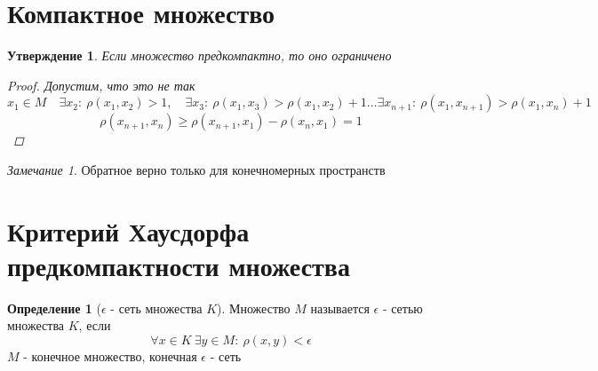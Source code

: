 \documentclass[a4paper]{article}
\newtheorem*{statement}{Утверждение}
\theoremstyle{definition}
\newtheorem*{definition}{Определение}
\theoremstyle{remark}
\newtheorem*{remark}{Замечание}
\begin{document}
\section*{\centering Компактное множество}

\begin{tcolorbox}
    \begin{statement}
        Если множество предкомпактно, то оно ограничено

        \begin{proof}
            Допустим, что это не так
            \[
                x_1 \in M \quad \exists x_2: \ \rho(x_1, x_2) > 1, \quad
                \exists x_3: \ \rho(x_1, x_3) > \rho(x_1, x_2) + 1 \dots
                \exists x_{n+1}: \ \rho(x_1, x_{n+1}) > \rho(x_1, x_n) + 1
            \]
            \[
                \rho(x_{n+1}, x_n) \geq \rho(x_{n+1}, x_1) - \rho(x_n, x_1) = 1
            \]
        \end{proof}
    \end{statement}
\end{tcolorbox}

\begin{tcolorbox}
    \begin{remark}
        Обратное верно только для конечномерных пространств
    \end{remark}
\end{tcolorbox}

\section*{\centering Критерий Хаусдорфа предкомпактности множества}

\begin{tcolorbox}
    \begin{definition}[$ \epsilon $ - сеть множества $K$]
        Множество $ M $ называется $ \epsilon $ - сетью множества $ K $, 
        если
        \[
            \forall x \in K \ \exists y \in M: \ \rho(x,y) < \epsilon
        \]
        $ M $ - конечное множество, конечная $ \epsilon $ - сеть
    \end{definition}
\end{tcolorbox}
\end{document}
